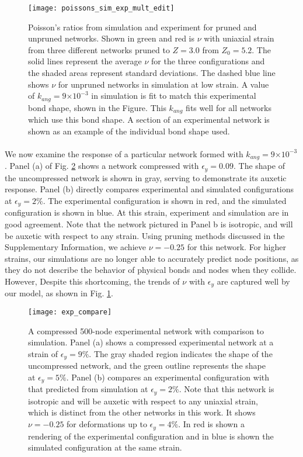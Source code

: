 \documentclass[9pt,twocolumn,twoside]{pnas-new}
\providecommand{\e}[1]{\ensuremath{\times 10^{#1}}}
\begin{document}
\begin{figure}
	\centering
	\texttt{[image: poissons\_sim\_exp\_mult\_edit]}
\caption{Poisson's ratios from simulation and experiment for pruned and unpruned networks.  Shown in green and red is $\nu$ with uniaxial strain from three different networks pruned to $Z=3.0$ from $Z_{0}=5.2$.  The solid lines represent the average $\nu$ for the three configurations and the shaded areas represent standard deviations.  The dashed blue line shows $\nu$ for unpruned networks in simulation at low strain.  A value of $k_{ang}=9\e{-3}$ in simulation is fit to match this experimental bond shape, shown in the Figure.  This $k_{ang}$ fits well for all networks which use this bond shape.  A section of an experimental network is shown as an example of the individual bond shape used.}


	\label{fig:poissons_sim_exp}
\end{figure}

\paragraph{}
We now examine the response of a particular network formed with $k_{ang} = 9\e{-3}$. Panel (a) of Fig. \ref{fig:exp_compare_config} shows a network compressed with $\epsilon_{y} = 0.09$.  The shape of the uncompressed network is shown in gray, serving to demonstrate its auxetic response.  Panel (b) directly compares experimental and simulated configurations at $\epsilon_{y} = 2\%$.  The experimental configuration is shown in red, and the simulated configuration is shown in blue. At this strain, experiment and simulation are in good agreement.  Note that the network pictured in Panel b is isotropic, and will be auxetic with respect to any strain.  Using pruning methods discussed in the Supplementary Information, we achieve $\nu=-0.25$ for this network.  For higher strains, our simulations are no longer able to accurately predict node positions, as they do not describe the behavior of physical bonds and nodes when they collide.  However, Despite this shortcoming, the trends of $\nu$ with $\epsilon_{y}$ are captured well by our model, as shown in Fig. \ref{fig:poissons_sim_exp}.

\begin{figure}
	\centering
	\texttt{[image: exp\_compare]}
	\caption{A compressed 500-node experimental network with comparison to simulation.  Panel (a) shows a compressed experimental network at a strain of $\epsilon_{y}=9\%$.  The gray shaded region indicates the shape of the uncompressed network, and the green outline represents the shape at $\epsilon_{y}=5\%$. Panel (b) compares an experimental configuration with that predicted from simulation at $\epsilon_{y}=2\%$.  Note that this network is isotropic and will be auxetic with respect to any uniaxial strain, which is distinct from the other networks in this work.  It shows $\nu=-0.25$ for deformations up to $\epsilon_{y}=4\%$. In red is shown a rendering of the experimental configuration and in blue is shown the simulated configuration at the same strain.  }
	\label{fig:exp_compare_config}
\end{figure}
\end{document}

